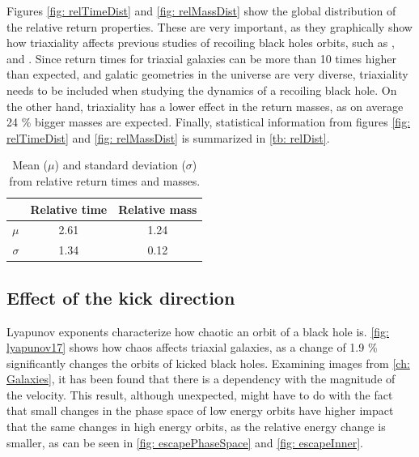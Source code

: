 	Figures \ref{fig: relTimeDist} and \ref{fig: relMassDist} show the global distribution of the relative return properties. These are very important, as they graphically show how triaxiality affects previous studies of recoiling black holes orbits, such as \citeauthor{choksi2017recoiling}, \citeauthor{tanaka2009assembly} and \citeauthor{gualandris2008ejection}. Since return times for triaxial galaxies can be more than 10 times higher than expected, and galatic geometries in the universe are very diverse, triaxiality needs to be included when studying the dynamics of a recoiling black hole. On the other hand, triaxiality has a lower effect in the return masses, as on average 24 \% bigger masses are expected. Finally, statistical information from figures \ref{fig: relTimeDist} and \ref{fig: relMassDist} is summarized in \autoref{tb: relDist}.
	\begin{table}[h]
		\centering
		\caption{Mean ($\mu$) and standard deviation ($\sigma$) from relative return times and masses.}
		\begin{tabular}{r|cc}
			\hline & \textbf{Relative time} & \textbf{Relative mass} \\
			\hline
			$\mu$ & 2.61 & 1.24 \\
			$\sigma$ & 1.34 & 0.12 \\
			\hline
		\end{tabular}
		\label{tb: relDist}
	\end{table}
	
	\newpage
	\subsection{Effect of the kick direction}
	Lyapunov exponents characterize how chaotic an orbit of a black hole is. \autoref{fig: lyapunov17} shows how chaos affects triaxial galaxies, as a change of 1.9 \% significantly changes the orbits of kicked black holes. Examining images from \autoref{ch: Galaxies}, it has been found that there is a dependency with the magnitude of the velocity. This result, although unexpected, might have to do with the fact that small changes in the phase space of low energy orbits have higher impact that the same changes in high energy orbits, as the relative energy change is smaller, as can be seen in \autoref{fig: escapePhaseSpace} and \autoref{fig: escapeInner}.
	
